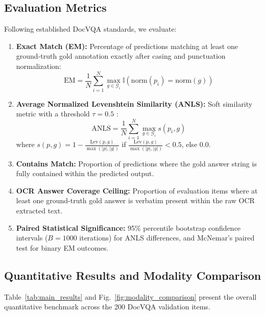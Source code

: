 \documentclass[conference]{IEEEtran}
\begin{document}
{\subsection{Evaluation Metrics}
Following established DocVQA standards, we evaluate:
\begin{enumerate}
    \item \textbf{Exact Match (EM):} Percentage of predictions matching at least one ground-truth gold annotation exactly after casing and punctuation normalization:
    \begin{equation}
        \text{EM} = \frac{1}{N} \sum_{i=1}^N \max_{g \in \mathcal{G}_i} \mathbb{I}(\text{norm}(p_i) = \text{norm}(g))
        \label{eq:em}
    \end{equation}
    \item \textbf{Average Normalized Levenshtein Similarity (ANLS):} Soft similarity metric with a threshold $\tau = 0.5$ \cite{b2}:
    \begin{equation}
        \text{ANLS} = \frac{1}{N} \sum_{i=1}^N \max_{g \in \mathcal{G}_i} s(p_i, g)
        \label{eq:anls}
    \end{equation}
    where $s(p, g) = 1 - \frac{\text{Lev}(p, g)}{\max(|p|, |g|)}$ if $\frac{\text{Lev}(p, g)}{\max(|p|, |g|)} < 0.5$, else $0.0$.
    \item \textbf{Contains Match:} Proportion of predictions where the gold answer string is fully contained within the predicted output.
    \item \textbf{OCR Answer Coverage Ceiling:} Proportion of evaluation items where at least one ground-truth gold answer is verbatim present within the raw OCR extracted text.
    \item \textbf{Paired Statistical Significance:} 95\% percentile bootstrap confidence intervals ($B = 1000$ iterations) for ANLS differences, and McNemar's paired test for binary EM outcomes.
\end{enumerate}

\subsection{Quantitative Results and Modality Comparison}
Table~\ref{tab:main_results} and Fig.~\ref{fig:modality_comparison} present the overall quantitative benchmark across the 200 DocVQA validation items.

}
\end{document}
